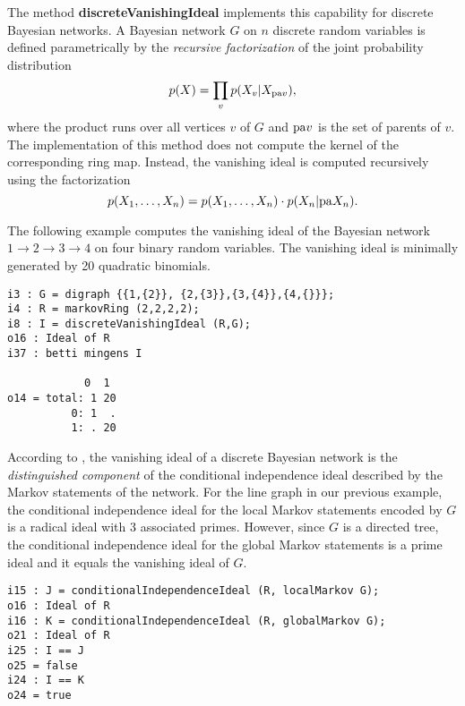 \documentclass[letterpaper]{article}
\theoremstyle{definition}
\newcommand{\pa}{{\rm pa}}
\begin{document}
The method
\textbf{discreteVanishingIdeal} implements this capability for discrete Bayesian
networks. A Bayesian network $G$ on $n$ discrete random variables 
is defined parametrically by the
\emph{recursive factorization} of the joint probability  distribution
\[p(X) = \prod_{v} p(X_{v} | X_{\pa v}),\]
where the product runs over all vertices $v$ of $G$ and $\pa v$ is the set of
parents of $v$. 
The implementation of this method does not compute the kernel of the
corresponding ring map. Instead, the vanishing ideal is
computed recursively using the factorization 
\[p(X_{1},\dots, X_{n}) = p(X_{1},\dots, X_{n})\cdot p(X_{n} | \pa X_{n}).\]

The following example computes the vanishing ideal of the Bayesian network $1\to
2 \to 3\to 4$ on four binary random variables. The vanishing ideal is
minimally generated by 20 quadratic binomials.

\begin{verbatim}
i3 : G = digraph {{1,{2}}, {2,{3}},{3,{4}},{4,{}}};
i4 : R = markovRing (2,2,2,2);
i8 : I = discreteVanishingIdeal (R,G);
o16 : Ideal of R
i37 : betti mingens I

            0  1
o14 = total: 1 20
          0: 1  .
          1: . 20
\end{verbatim}

According to \cite{GSS}, the vanishing ideal of a discrete Bayesian network is the \emph{distinguished
  component} of the conditional independence ideal described by the Markov
statements of the network. For the line graph in our previous example, the
conditional independence ideal for the local Markov statements encoded by $G$
is a radical ideal with 3 associated primes. However, since $G$ is a directed
tree, the conditional independence ideal for the global Markov statements is a
prime ideal and it equals the vanishing ideal of $G$.

 \begin{verbatim}
i15 : J = conditionalIndependenceIdeal (R, localMarkov G);
o16 : Ideal of R
i16 : K = conditionalIndependenceIdeal (R, globalMarkov G);
o21 : Ideal of R
i25 : I == J
o25 = false
i24 : I == K
o24 = true
\end{verbatim}
\end{document}
